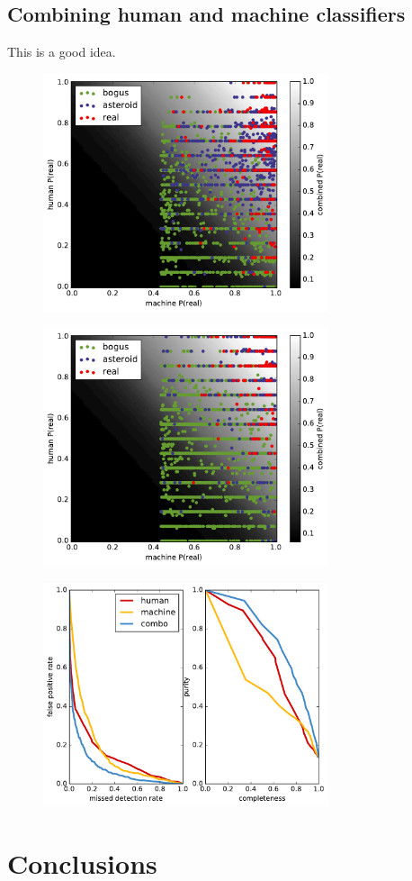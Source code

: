 \documentclass[a4paper,fleqn,usenatbib]{mnras}
\begin{document}
\subsection{Combining human and machine classifiers}

This is a good idea.




\begin{figure}
   \includegraphics[width=84mm]{figs/human_v_machine_train.pdf}
   \caption{} 
   \label{fig:combo_train} 
\end{figure}

\begin{figure}
   \includegraphics[width=84mm]{figs/human_v_machine_test.pdf}
   \caption{} 
   \label{fig:combo_test} 
\end{figure}

\begin{figure}
   \includegraphics[width=84mm]{figs/roc.pdf}
   \caption{} 
   \label{fig:roc} 
\end{figure}

\section{Conclusions}

\bsp	%
\label{lastpage}
\end{document}
